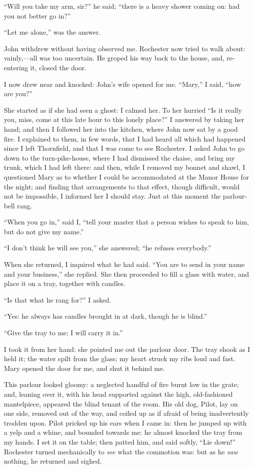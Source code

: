 \enquote{Will you take my arm, sir?} he said; \enquote{there is a heavy
	shower coming on: had you not better go in?}

\enquote{Let me alone,} was the answer.

John withdrew without having observed me. \Mr{} Rochester now tried to
walk about: vainly,---all was too uncertain. He groped his way back to
the house, and, re-entering it, closed the door.

I now drew near and knocked: John's wife opened for me. \enquote{Mary,}
I said, \enquote{how are you?}

She started as if she had seen a ghost: I calmed her. To her hurried
\enquote{Is it really you, miss, come at this late hour to this lonely
	place?} I answered by taking her hand; and then I followed her into the
kitchen, where John now sat by a good fire. I explained to them, in few
words, that I had heard all which had happened since I left Thornfield,
and that I was come to see \Mr{} Rochester. I asked John to go down to
the turn-pike-house, where I had dismissed the chaise, and bring my
trunk, which I had left there: and then, while I removed my bonnet and
shawl, I questioned Mary as to whether I could be accommodated at the
Manor House for the night; and finding that arrangements to that effect,
though difficult, would not be impossible, I informed her I should
stay. Just at this moment the parlour-bell rang.

\enquote{When you go in,} said I, \enquote{tell your master that a
	person wishes to speak to him, but do not give my name.}

\enquote{I don't think he will see you,} she answered; \enquote{he
	refuses everybody.}

When she returned, I inquired what he had said. \enquote{You are to
	send in your name and your business,} she replied. She then proceeded
to fill a glass with water, and place it on a tray, together with
candles.

\enquote{Is that what he rang for?} I asked.

\enquote{Yes: he always has candles brought in at dark, though he is
	blind.}

\enquote{Give the tray to me; I will carry it in.}

I took it from her hand: she pointed me out the parlour door. The tray
shook as I held it; the water spilt from the glass; my heart struck my
ribs loud and fast. Mary opened the door for me, and shut it behind me.

This parlour looked gloomy: a neglected handful of fire burnt low in the
grate; and, leaning over it, with his head supported against the high,
old-fashioned mantelpiece, appeared the blind tenant of the room. His
old dog, Pilot, lay on one side, removed out of the way, and coiled up
as if afraid of being inadvertently trodden upon. Pilot pricked up his
ears when I came in: then he jumped up with a yelp and a whine, and
bounded towards me: he almost knocked the tray from my hands. I set it
on the table; then patted him, and said softly, \enquote{Lie down!} \Mr{}
Rochester turned mechanically to \emph{see} what the commotion was: but
as he \emph{saw} nothing, he returned and sighed.

